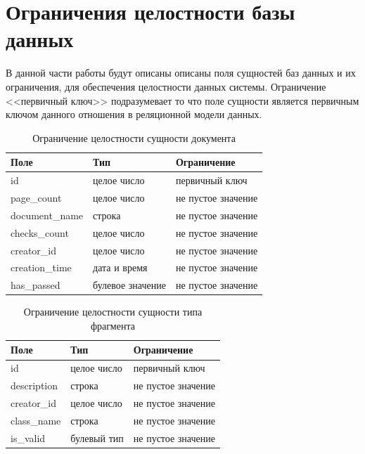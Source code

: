 \section{Ограничения целостности базы данных}
В данной части работы будут описаны описаны поля сущностей баз данных и их ограничения, для обеспечения целостности данных системы. Ограничение <<первичный ключ>> подразумевает то что поле сущности является первичным ключом данного отношения в реляционной модели данных.
\begin{table}[h!tbp]
	\centering
	\caption{Ограничение целостности сущности документа}
	\begin{tabularx}{\textwidth}{|X|X|X|}
		\hline
		Поле & Тип & Ограничение \\
		\hline
		id & целое число & первичный ключ \\
		\hline
		page\_count & целое число & не пустое значение\\
		\hline
		document\_name & строка & не пустое значение\\
		\hline
		checks\_count & целое число & не пустое значение\\
		\hline
		creator\_id & целое число & не пустое значение\\
		\hline
		creation\_time & дата и время & не пустое значение\\
		\hline
		has\_passed & булевое значение & не пустое значение\\
		\hline
	\end{tabularx}

	\label{t:documents_cons}
\end{table}

\begin{table}[h!tbp]
	\centering
	\caption{Ограничение целостности сущности типа фрагмента}
	\begin{tabularx}{\textwidth}{|X|X|X|}
		\hline
		Поле & Тип & Ограничение \\
		\hline
	  	id & целое число & первичный ключ \\
	  	\hline
		description & строка & не пустое значение \\
		\hline
		creator\_id & целое число & не пустое значение\\
		\hline
		class\_name & строка & не пустое значение\\
		is\_valid & булевый тип & не пустое значение \\
		
		\hline
	\end{tabularx}
	
	\label{t:markup_type_cons}
\end{table}

